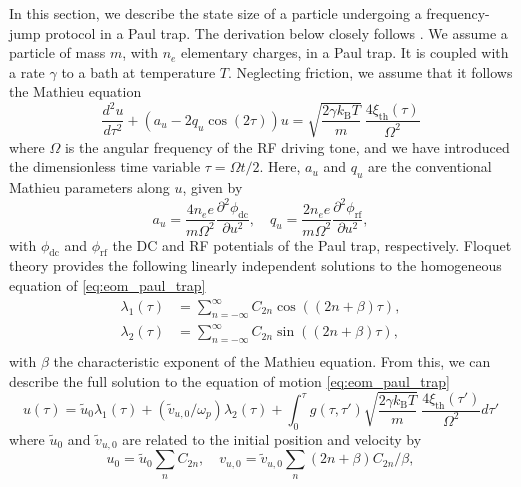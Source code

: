 In this section, we describe the state size of a particle undergoing a frequency-jump protocol in a Paul trap. The derivation below closely follows \cite{joos1989langevin}. 
We assume a particle of mass $m$, with $n_e$ elementary charges, in a Paul trap. It is coupled with a rate $\gamma$ to a bath at temperature $T$. Neglecting friction, we assume that it follows the Mathieu equation \cite{mclachlan1964theory}
%
\begin{equation}
	\frac{d^2u}{d\tau^2}
	+ \left(a_u-2q_u\cos(2\tau)\right)u
	=  \sqrt{\frac{2\gamma k_\text{B} T}{m}}~\frac{4\xi_\text{th}(\tau)}{\Omega^2}
	\label{eq:eom_paul_trap}
\end{equation}
%
where $\Omega$ is the angular frequency of the RF driving tone, and we have introduced the dimensionless time variable $\tau=\Omega t/2$. Here, $a_u$ and $q_u$ are the conventional Mathieu parameters along $u$, given by
%
\begin{equation}
    a_u = \frac{4n_ee}{m\Omega^2}\frac{\partial^2\phi_\text{dc}}{\partial u^2} , \quad
    q_u = \frac{2n_ee}{m\Omega^2}\frac{\partial^2\phi_\text{rf}}{\partial u^2},
\end{equation}
%
with $\phi_\text{dc}$ and $\phi_\text{rf}$ the DC and RF potentials of the Paul trap, respectively.
%
Floquet theory \cite{meixner1954mathieu, abramowitz1964handbook} provides the following linearly independent solutions to the homogeneous equation of \cref{eq:eom_paul_trap}
%
\begin{equation}
  \begin{aligned}
  	\lambda_1(\tau)
  	 &= \sum_{n=-\infty}^{\infty}C_{2n}\cos((2n+\beta)\tau),\\
  	\lambda_2(\tau) &= \sum_{n=-\infty}^{\infty}C_{2n}\sin((2n+\beta)\tau),\\
  \end{aligned}
  \label{eq:homogeneous_soln}
\end{equation}
%
with $\beta$ the characteristic exponent of the Mathieu equation. From this, we can describe the full solution to the equation of motion \cref{eq:eom_paul_trap}
%
\begin{equation}
 u(\tau) = \tilde{u}_0\lambda_1(\tau)
 		   + (\tilde{v}_{u,0}/{\omega_p})\lambda_2(\tau)
 		   +\int_0^{\tau} g(\tau, \tau')
 		   \sqrt{\frac{2\gamma k_\text{B} T}{m}}~\frac{4\xi_\text{th}(\tau')}{\Omega^2}d\tau'
\label{eq:eom_solution_paul_trap}
\end{equation}
%
where $\tilde{u}_0$ and $\tilde{v}_{u,0}$ are related to the initial position and velocity by 
%
\begin{equation}
    u_0 = \tilde{u}_0\sum_n C_{2n} , \quad
    v_{u,0} = \tilde{v}_{u,0}\sum_n (2n+\beta) C_{2n}/\beta,
\end{equation}
